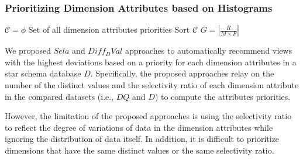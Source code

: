 \subsubsection{Prioritizing Dimension Attributes based on Histograms}
\label{sec:priority_hist}
%
\begin{algorithm}[t]
\label{alg:prio_hist}
\caption{$DimsHisto$}
$\mathcal{C} = \phi$ Set of all dimension attributes priorities \;
Sort $\mathcal{C}$\;
	$G= |\frac{R}{M \times F}|$ \;
		\;
\end{algorithm}
We proposed $Sela$ and $Diff_DVal$ approaches to automatically recommend views with the highest deviations based on a priority for each dimension attributes in a star schema database $D$.
%
Specifically, the proposed approaches relay on the number of the distinct values and the selectivity ratio of each dimension attribute in the compared datasets (i.e., $DQ$ and $D$) to compute the attributes priorities.
%

However, the limitation
of the proposed approaches is using the selectivity ratio 
to reflect the degree of variations of data in the dimension attributes while ignoring the distribution of data itself. 
%
In addition, it is difficult to prioritize dimensions that have the same distinct values or the same selectivity ratio.
%

